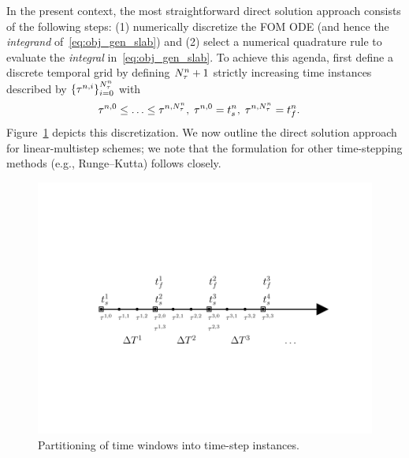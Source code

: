 In the present context, the most straightforward direct solution approach consists of the 
following steps: (1) numerically discretize the FOM ODE (and hence the \textit{integrand} of~\eqref{eq:obj_gen_slab}) and 
(2) select a numerical quadrature rule to evaluate the \textit{integral} in~\eqref{eq:obj_gen_slab}.
To achieve this agenda, first define a discrete temporal grid 
by defining
$N_{\tau}^{n}+1$ strictly increasing time instances described by
$\{\tau^{n,i}\}_{i=0}^{N_{\tau}^{n}}$ with
\begin{align}
&\tau^{n,0} \le \ldots \le \tau^{n,N_{\tau}^{n}} , \label{eq:timegrid1} \;
\tau^{n,0} = t_s^{n},\;
\tau^{n,N_{\tau}^{n}} = t_f^{n} . 
\end{align}
Figure~\ref{fig:slab_fig2} depicts this discretization.
We now outline the direct solution approach for linear-multistep schemes; we note that the formulation for
other time-stepping methods (e.g., Runge--Kutta) follows closely. 
\begin{figure} 
\begin{centering} 
\includegraphics[trim={0.0cm 5cm 0cm 3cm},clip,width=1.0\textwidth]{figs/time_grid_timesteps.pdf} 
	\caption{Partitioning of time windows into time-step instances. } 
\label{fig:slab_fig2} 
\end{centering} 
\end{figure}

